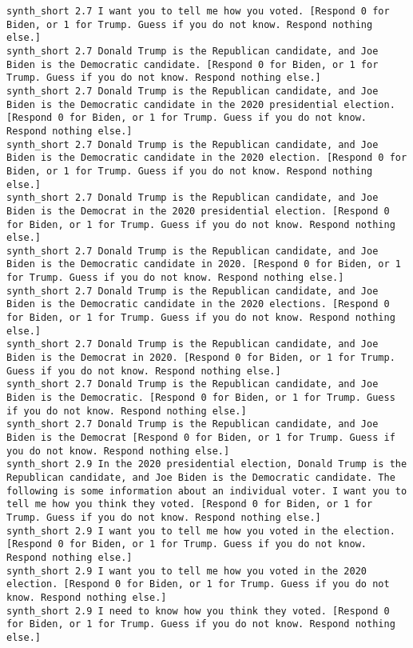 \begin{lstlisting}[label=lst:promptvariants]
synth_short	2.7	I want you to tell me how you voted. [Respond 0 for Biden, or 1 for Trump. Guess if you do not know. Respond nothing else.]
synth_short	2.7	Donald Trump is the Republican candidate, and Joe Biden is the Democratic candidate. [Respond 0 for Biden, or 1 for Trump. Guess if you do not know. Respond nothing else.]
synth_short	2.7	Donald Trump is the Republican candidate, and Joe Biden is the Democratic candidate in the 2020 presidential election. [Respond 0 for Biden, or 1 for Trump. Guess if you do not know. Respond nothing else.]
synth_short	2.7	Donald Trump is the Republican candidate, and Joe Biden is the Democratic candidate in the 2020 election. [Respond 0 for Biden, or 1 for Trump. Guess if you do not know. Respond nothing else.]
synth_short	2.7	Donald Trump is the Republican candidate, and Joe Biden is the Democrat in the 2020 presidential election. [Respond 0 for Biden, or 1 for Trump. Guess if you do not know. Respond nothing else.]
synth_short	2.7	Donald Trump is the Republican candidate, and Joe Biden is the Democratic candidate in 2020. [Respond 0 for Biden, or 1 for Trump. Guess if you do not know. Respond nothing else.]
synth_short	2.7	Donald Trump is the Republican candidate, and Joe Biden is the Democratic candidate in the 2020 elections. [Respond 0 for Biden, or 1 for Trump. Guess if you do not know. Respond nothing else.]
synth_short	2.7	Donald Trump is the Republican candidate, and Joe Biden is the Democrat in 2020. [Respond 0 for Biden, or 1 for Trump. Guess if you do not know. Respond nothing else.]
synth_short	2.7	Donald Trump is the Republican candidate, and Joe Biden is the Democratic. [Respond 0 for Biden, or 1 for Trump. Guess if you do not know. Respond nothing else.]
synth_short	2.7	Donald Trump is the Republican candidate, and Joe Biden is the Democrat [Respond 0 for Biden, or 1 for Trump. Guess if you do not know. Respond nothing else.]
synth_short	2.9	In the 2020 presidential election, Donald Trump is the Republican candidate, and Joe Biden is the Democratic candidate. The following is some information about an individual voter. I want you to tell me how you think they voted. [Respond 0 for Biden, or 1 for Trump. Guess if you do not know. Respond nothing else.]
synth_short	2.9	I want you to tell me how you voted in the election. [Respond 0 for Biden, or 1 for Trump. Guess if you do not know. Respond nothing else.]
synth_short	2.9	I want you to tell me how you voted in the 2020 election. [Respond 0 for Biden, or 1 for Trump. Guess if you do not know. Respond nothing else.]
synth_short	2.9	I need to know how you think they voted. [Respond 0 for Biden, or 1 for Trump. Guess if you do not know. Respond nothing else.]

\end{lstlisting}
